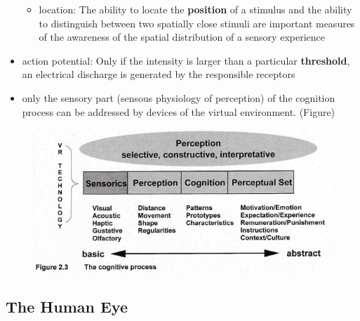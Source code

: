 \documentclass{standalone}
\begin{document}
\begin{itemize}
\begin{itemize}
		\item location: The ability to locate the \textbf{position} of a stimulus and the ability to distinguish between two spatially close stimuli are important measures of the awareness of the spatial distribution of a sensory experience
	\end{itemize}
	\item action potential: Only if the intensity is larger than a particular \textbf{threshold}, an electrical discharge is generated by the responsible receptors
	\item only the sensory part (sensous physiology of perception) of the cognition process can be addressed by devices of the virtual environment. (Figure)
\end{itemize}
\begin{figure}[H]
\centering
\includegraphics[width = 0.7\linewidth]{Figures/2_3.png}
\end{figure}
\subsection{The Human Eye}
\end{document}
